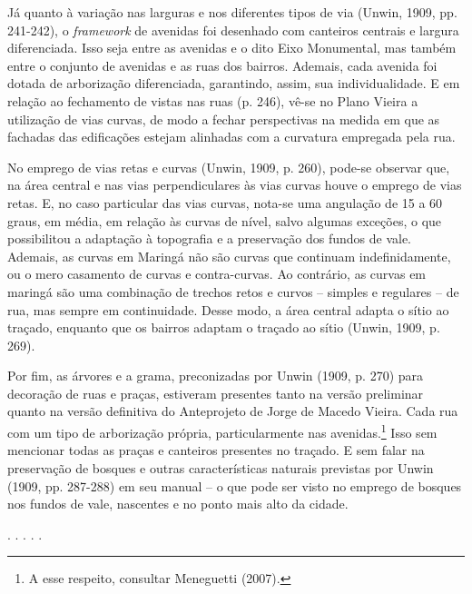 \documentclass[12pt, a4paper]{book} %
\begin{document}
        Já quanto à variação nas larguras e nos diferentes tipos de via (Unwin, 1909, pp. 241-242), o \textit{framework} de avenidas foi desenhado com canteiros centrais e largura diferenciada. Isso seja entre as avenidas e o dito Eixo Monumental, mas também entre o conjunto de avenidas e as ruas dos bairros. Ademais, cada avenida foi dotada de arborização diferenciada, garantindo, assim, sua individualidade. E em relação ao fechamento de vistas nas ruas (p. 246), vê-se no Plano Vieira a utilização de vias curvas, de modo a fechar perspectivas na medida em que as fachadas das edificações estejam alinhadas com a curvatura empregada pela rua.

        No emprego de vias retas e curvas (Unwin, 1909, p. 260), pode-se observar que, na área central e nas vias perpendiculares às vias curvas houve o emprego de vias retas. E, no caso particular das vias curvas, nota-se uma angulação de 15 a 60 graus, em média, em relação às curvas de nível, salvo algumas exceções, o que possibilitou a adaptação à topografia e a preservação dos fundos de vale. Ademais, as curvas em Maringá não são curvas que continuam indefinidamente, ou o mero casamento de curvas e contra-curvas. Ao contrário, as curvas em maringá são uma combinação de trechos retos e curvos – simples e regulares – de rua, mas sempre em continuidade. Desse modo, a área central adapta o sítio ao traçado, enquanto que os bairros adaptam o traçado ao sítio (Unwin, 1909, p. 269).

        Por fim, as árvores e a grama, preconizadas por Unwin (1909, p. 270) para decoração de ruas e praças, estiveram presentes tanto na versão preliminar quanto na versão definitiva do Anteprojeto de Jorge de Macedo Vieira. Cada rua com um tipo de arborização própria, particularmente nas avenidas.\footnote[23]{A esse respeito, consultar Meneguetti (2007).} Isso sem mencionar todas as praças e canteiros presentes no traçado. E sem falar na preservação de bosques e outras características naturais previstas por Unwin (1909, pp. 287-288) em seu manual – o que pode ser visto no emprego de bosques nos fundos de vale, nascentes e no ponto mais alto da cidade.

        \begin{center}
            . . . . .
        \end{center} 
\end{document}
